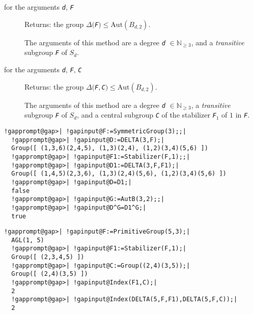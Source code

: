 \documentclass[a4paper,11pt]{report}
\begin{document}
{{{ 

 
\begin{description}
\item[{for the arguments \mbox{\texttt{\mdseries\slshape d}}, \mbox{\texttt{\mdseries\slshape F}}}]  Returns: the group $\Delta($\mbox{\texttt{\mdseries\slshape F}}$)\le\mathrm{Aut}(B_{d,2})$. 

 The arguments of this method are a degree \mbox{\texttt{\mdseries\slshape d}} $\in\mathbb{N}_{\ge 3}$, and a \emph{transitive} subgroup \mbox{\texttt{\mdseries\slshape F}} of $S_{d}$. 
\item[{for the arguments \mbox{\texttt{\mdseries\slshape d}}, \mbox{\texttt{\mdseries\slshape F}}, \mbox{\texttt{\mdseries\slshape C}}}]  Returns: the group $\Delta($\mbox{\texttt{\mdseries\slshape F}}$,$\mbox{\texttt{\mdseries\slshape C}}$)\le\mathrm{Aut}(B_{d,2})$. 

 The arguments of this method are a degree \mbox{\texttt{\mdseries\slshape d}} $\in\mathbb{N}_{\ge 3}$, a \emph{transitive} subgroup \mbox{\texttt{\mdseries\slshape F}} of $S_d$, and a central subgroup \mbox{\texttt{\mdseries\slshape C}} of the stabilizer \mbox{\texttt{\mdseries\slshape F}}$_{1}$ of $1$ in \mbox{\texttt{\mdseries\slshape F}}. 
\end{description}
 

 }

 

 
\begin{Verbatim}[commandchars=!@|,fontsize=\small,frame=single,label=Example]
  !gapprompt@gap>| !gapinput@F:=SymmetricGroup(3);;|
  !gapprompt@gap>| !gapinput@D:=DELTA(3,F);|
  Group([ (1,3,6)(2,4,5), (1,3)(2,4), (1,2)(3,4)(5,6) ])
  !gapprompt@gap>| !gapinput@F1:=Stabilizer(F,1);;|
  !gapprompt@gap>| !gapinput@D1:=DELTA(3,F,F1);|
  Group([ (1,4,5)(2,3,6), (1,3)(2,4)(5,6), (1,2)(3,4)(5,6) ])
  !gapprompt@gap>| !gapinput@D=D1;|
  false
  !gapprompt@gap>| !gapinput@G:=AutB(3,2);;|
  !gapprompt@gap>| !gapinput@D^G=D1^G;|
  true
\end{Verbatim}
 

 
\begin{Verbatim}[commandchars=!@|,fontsize=\small,frame=single,label=Example]
  !gapprompt@gap>| !gapinput@F:=PrimitiveGroup(5,3);|
  AGL(1, 5)
  !gapprompt@gap>| !gapinput@F1:=Stabilizer(F,1);|
  Group([ (2,3,4,5) ])
  !gapprompt@gap>| !gapinput@C:=Group((2,4)(3,5));|
  Group([ (2,4)(3,5) ])
  !gapprompt@gap>| !gapinput@Index(F1,C);|
  2
  !gapprompt@gap>| !gapinput@Index(DELTA(5,F,F1),DELTA(5,F,C));|
  2
\end{Verbatim}
 

}}
\end{document}
